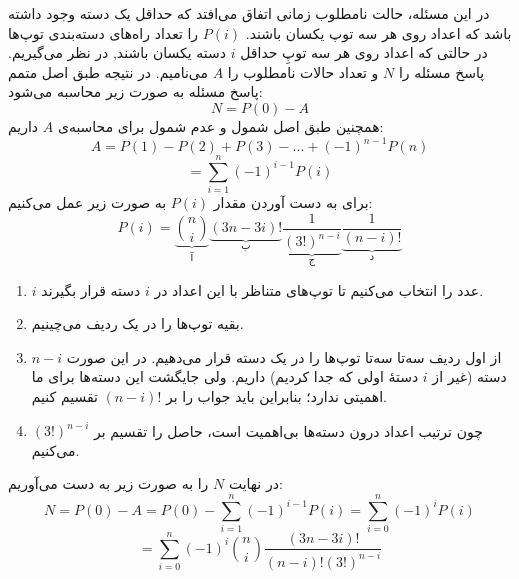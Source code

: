    \p
در این مسئله، حالت نامطلوب زمانی اتفاق می‌افتد که حداقل یک دسته‌ وجود داشته باشد که اعداد روی هر سه توپ یکسان باشند.
$P(i)$
را تعداد راه‌های دسته‌بندی توپ‌ها 
در حالتی که
 اعداد روی هر سه توپِ حداقل
   $i$
دسته یکسان باشند, در نظر می‌گیریم. پاسخ مسئله
را $N$
و تعداد حالات نامطلوب را
 $A$ 
 می‌نامیم. در نتیجه طبق اصل متمم پاسخ مسئله به صورت زیر محاسبه‌ می‌شود:
$$N = P(0) - A$$
همچنین طبق اصل شمول و عدم شمول برای محاسبه‌ی 
$A$
داریم:
$$A = P(1) - P(2) + P(3) - ... + (-1)^{n-1}P(n)$$
$$= \sum\limits_{i = 1}^n (-1)^{i-1} P(i)$$
برای به دست آوردن مقدار 
$P(i)$
به صورت زیر عمل می‌کنیم:
$$P(i) = \underbrace{{n  \choose i}}_{\text{آ}}\underbrace{(3n - 3i)!}_{\text{ب}}\underbrace{\frac{1}{(3!)^{n - i}}}_{\text{ج}} \underbrace{\frac{1}{(n - i)!}}_{\text{د}}$$
\begin{enumerate}
	\item 
    	$i$
    	 عدد را انتخاب می‌کنیم تا توپ‌های متناظر با این اعداد در 
    	 $i$
    	  دسته قرار بگیرند.
    	
	\item 
        بقیه توپ‌ها را در یک ردیف می‌چینیم.

    \item
		از اول ردیف سه‌تا سه‌تا توپ‌ها را در یک دسته قرار می‌دهیم. در این صورت $n - i$ دسته (غیر از 
    	$i$ 
    	دستهٔ اولی که جدا کردیم) داریم. ولی جایگشت این دسته‌ها برای ما اهمیتی ندارد؛ بنابراین باید جواب را بر $(n-i)!$ تقسیم کنیم.
    
    	
    \item     
		  چون ترتیب اعداد درون دسته‌ها بی‌اهمیت است، حاصل را تقسیم بر
		  $(3!)^{n-i}$
		   می‌کنیم.

    
	\end{enumerate}
    در نهایت $N$ 
    را به صورت زیر به دست می‌آوریم:
	$$N = P(0) - A = P(0) - \sum\limits_{i = 1}^n (-1)^{i-1} P(i) = \sum\limits_{i = 0}^n (-1)^{i} P(i)$$
	$$= \sum\limits_{i = 0}^n (-1)^i {n \choose i} \frac{(3n - 3i)!}{(n - i)! (3!)^{n - i}}$$

   